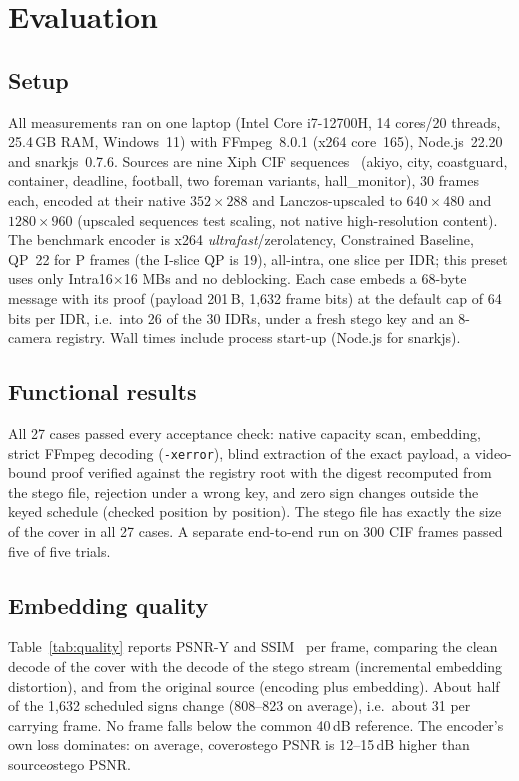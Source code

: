 \section{Evaluation}
\label{sec:eval}

\subsection{Setup}
All measurements ran on one laptop (Intel Core i7-12700H, 14 cores/20 threads, 25.4\,GB RAM, Windows~11) with FFmpeg~8.0.1 (x264 core~165), Node.js~22.20 and snarkjs~0.7.6. Sources are nine Xiph CIF sequences~\cite{xiph_media} (akiyo, city, coastguard, container, deadline, football, two foreman variants, hall\_monitor), 30 frames each, encoded at their native $352\times288$ and Lanczos-upscaled to $640\times480$ and $1280\times960$ (upscaled sequences test scaling, not native high-resolution content). The benchmark encoder is x264 \emph{ultrafast}/zerolatency, Constrained Baseline, QP~22 for P frames (the I-slice QP is 19), all-intra, one slice per IDR; this preset uses only Intra16$\times$16 MBs and no deblocking. Each case embeds a 68-byte message with its proof (payload 201\,B, 1{,}632 frame bits) at the default cap of 64 bits per IDR, i.e.\ into 26 of the 30 IDRs, under a fresh stego key and an 8-camera registry. Wall times include process start-up (Node.js for snarkjs).

\subsection{Functional results}
All 27 cases passed every acceptance check: native capacity scan, embedding, strict FFmpeg decoding (\texttt{-xerror}), blind extraction of the exact payload, a video-bound proof verified against the registry root with the digest recomputed from the stego file, rejection under a wrong key, and zero sign changes outside the keyed schedule (checked position by position). The stego file has exactly the size of the cover in all 27 cases. A separate end-to-end run on 300 CIF frames passed five of five trials.

\subsection{Embedding quality}
Table~\ref{tab:quality} reports PSNR-Y and SSIM~\cite{wang2004ssim} per frame, comparing the clean decode of the cover with the decode of the stego stream (incremental embedding distortion), and from the original source (encoding plus embedding). About half of the 1{,}632 scheduled signs change (808--823 on average), i.e.\ about 31 per carrying frame. No frame falls below the common 40\,dB reference. The encoder's own loss dominates: on average, cover$	o$stego PSNR is 12--15\,dB higher than source$	o$stego PSNR.

